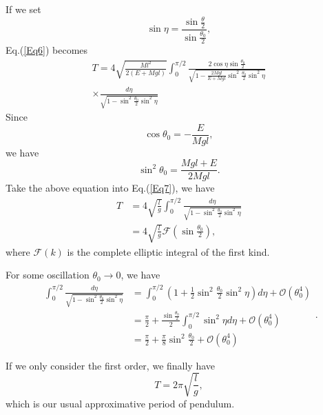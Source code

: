 \documentclass[%
 reprint,
 amsmath,amssymb,
 aps,
]{revtex4-1}
\begin{document}
If we set
\begin{equation}
    \sin{\eta}=\frac{\sin{\frac{\theta}{2}}}{\sin{\frac{\theta_0}{2}}},
\end{equation}
Eq.(\ref{Eq6}) becomes
\begin{equation}
\begin{aligned}
    T=4\sqrt{\frac{Ml^2}{2(E+Mgl)}}\int_0^{\pi/2}\frac{2\cos\eta\sin{\frac{\theta_0}{2}}}{\sqrt{1-\frac{2Mgl}{E+Mgl}\sin^2{\frac{\theta_0}{2}}\sin^2{\eta}}}\\
    \times\frac{d\eta}{\sqrt{1-\sin^2{\frac{\theta_0}{2}}\sin^2{\eta}}}
\label{Eq7}
\end{aligned}
\end{equation}
Since
\begin{equation}
    \cos{\theta_0}=-\frac{E}{Mgl},
\end{equation}
we have
\begin{equation}
    \sin^2{\theta_0}=\frac{Mgl+E}{2Mgl}.
\end{equation}
Take the above equation into Eq.(\ref{Eq7}), we have
\begin{equation}
\begin{aligned}
    T&=4\sqrt{\frac{l}{g}}\int_0^{\pi/2}\frac{d\eta}{\sqrt{1-\sin^2{\frac{\theta_0}{2}}\sin^2{\eta}}}\\
    &=4\sqrt{\frac{l}{g}}\mathcal{F}(\sin{\frac{\theta_0}{2}}),
\end{aligned}
\end{equation}
where $\mathcal{F}(k)$ is the complete elliptic integral of the first kind.

For some oscillation $\theta_0\rightarrow0$, we have
\begin{equation}
\begin{aligned}
    \int_0^{\pi/2}\frac{d\eta}{\sqrt{1-\sin^2{\frac{\theta_0}{2}}\sin^2{\eta}}}&=\int_0^{\pi/2}(1+\frac{1}{2}\sin^2{\frac{\theta_0}{2}}\sin^2{\eta})d\eta+\mathcal{O}(\theta_0^4)\\
    &=\frac{\pi}{2}+\frac{\sin{\frac{\theta_0}{2}}}{2}\int_0^{\pi/2}\sin^2{\eta}d\eta+\mathcal{O}(\theta_0^4)\\
    &=\frac{\pi}{2}+\frac{\pi}{8}\sin^2{\frac{\theta_0}{2}}+\mathcal{O}(\theta_0^4)
\end{aligned}.
\end{equation}

If we only consider the first order, we finally have
\begin{equation}
    T=2\pi\sqrt{\frac{l}{g}},
\end{equation}
which is our usual approximative period of pendulum.
\end{document}
